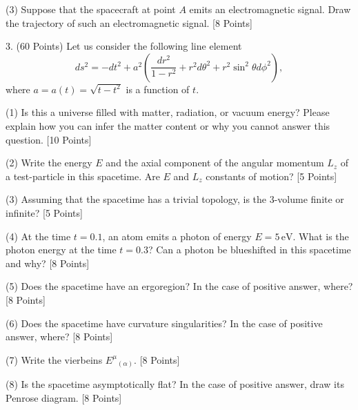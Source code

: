 (3) Suppose that the spacecraft at point $A$ emits an electromagnetic signal. Draw the trajectory of such an electromagnetic signal. [8 Points]

3. (60 Points) Let us consider the following line element
\begin{equation}
ds^2=-dt^2+a^2\left(\frac{dr^2}{1-r^2}+r^2d\theta^2+r^2\sin^2\theta d\phi^2\right),
\end{equation}
where $a=a(t)=\sqrt{t-t^2}$ is a function of $t$.

(1) Is this a universe filled with matter, radiation, or vacuum energy? Please explain how you can infer the matter content or why you cannot answer this question. [10 Points]

(2) Write the energy $E$ and the axial component of the angular momentum $L_z$ of a test-particle in this spacetime. Are $E$ and $L_z$ constants of motion? [5 Points]

(3) Assuming that the spacetime has a trivial topology, is the $3$-volume finite or infinite? [5 Points]

(4) At the time $t=0.1$, an atom emits a photon of energy $E=5\,\mathrm{eV}$. What is the photon energy at the time $t=0.3$? Can a photon be blueshifted in this spacetime and why? [8 Points]

(5) Does the spacetime have an ergoregion? In the case of positive answer, where? [8 Points]

(6) Does the spacetime have curvature singularities? In the case of positive answer, where? [8 Points]

(7) Write the vierbeins $E^\mu{}_{(\alpha)}$. [8 Points]

(8) Is the spacetime asymptotically flat? In the case of positive answer, draw its Penrose diagram. [8 Points]